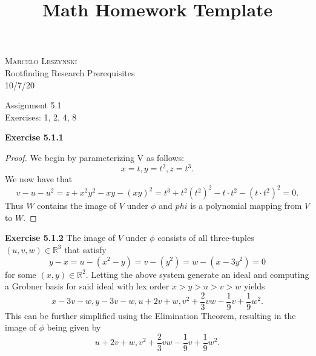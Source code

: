 \documentclass[12pt,oneside]{article}
\newenvironment{exercise}[1]{\vspace{.1in}\noindent\textbf{Exercise #1 \hspace{.05em}}}{}
\newcommand{\R}{\mathbb{R}}
\begin{document}
\title{Math Homework Template}

\begin{flushright}
\textsc{Marcelo Leszynski}  \\
Rootfinding Research Prerequisites\\
10/7/20
\end{flushright}

\begin{center}
\textsf{Assignment 5.1 } \\
\textsf{Exercises: 1, 2, 4, 8 }
\end{center}


\begin{exercise}{5.1.1}
    \begin{proof}
        We begin by parameterizing V as follows:
        \[
            x = t, y = t^2, z=t^3.    
        \]
        We now have that 
        \[
            v-u-u^2=z+x^2y^2-xy-(xy)^2=t^3+t^2(t^2)^2-t\cdot t^2-(t\cdot t^2)^2=0.
        \]
        Thus $W$ contains the image of $V$ under $\phi$ and $phi$ 
        is a polynomial mapping from $V$ to $W$.
    \end{proof}
\end{exercise}


\begin{exercise}{5.1.2}
    The image of $V$ under $\phi$ consists of all three-tuples 
    $(u,v,w) \in \R^3$ that satisfy 
    \[
        y-x = u - (x^2-y) = v - (y^2) = w - (x-3y^2) = 0    
    \] 
    for some $(x,y) \in \R^2$. Letting the above system generate 
    an ideal and computing a Grobner basis for said ideal with 
    lex order $x > y > u > v > w$ yields
    \[
        x-3v-w, y-3v-w, u+2v+w, v^2+\frac{2}{3}vw-\frac{1}{9}v+\frac{1}{9}w^2.    
    \]
    This can be further simplified using the Elimination Theorem, 
    resulting in the image of $\phi$ being given by 
    \[
        u+2v+w, v^2+\frac{2}{3}vw-\frac{1}{9}v+\frac{1}{9}w^2.    
    \]
\end{exercise}

\end{document}
